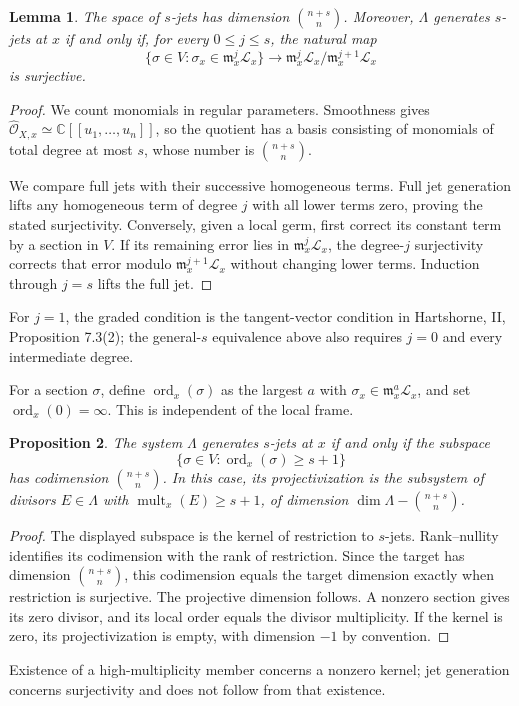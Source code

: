 \documentclass[12pt,a4paper,psamsfonts]{amsart}
\newtheorem{lemma}{Lemma}[section]
\newtheorem{proposition}[lemma]{Proposition}
\theoremstyle{definition}
\newcommand{\OO}{\mathcal O}
\newcommand{\C}{\mathbb C}
\begin{document}
\begin{lemma}
The space of $s$-jets has dimension $\binom{n+s}{n}$.
Moreover, $\Lambda$ generates $s$-jets at $x$ if and only if, for every
$0\le j\le s$, the natural map
\[
 \{\sigma\in V:\sigma_x\in\mathfrak m_x^j\mathcal L_x\}
 \longrightarrow
 \mathfrak m_x^j\mathcal L_x/\mathfrak m_x^{j+1}\mathcal L_x
\]
is surjective.
\end{lemma}
\begin{proof}
We count monomials in regular parameters. Smoothness gives
$\widehat{\OO}_{X,x}\simeq\C[[u_1,\ldots,u_n]]$, so the quotient has a
basis consisting of monomials of total degree at most $s$, whose number
is $\binom{n+s}{n}$.

We compare full jets with their successive homogeneous terms.
Full jet generation lifts any homogeneous term of degree $j$ with all
lower terms zero, proving the stated surjectivity. Conversely, given a
local germ, first correct its constant term by a section in $V$. If its
remaining error lies in $\mathfrak m_x^j\mathcal L_x$, the degree-$j$
surjectivity corrects that error modulo $\mathfrak m_x^{j+1}\mathcal L_x$
without changing lower terms. Induction through $j=s$ lifts the full jet.
\end{proof}
For $j=1$, the graded condition is the tangent-vector condition in
Hartshorne, II, Proposition 7.3(2); the general-$s$ equivalence above
also requires $j=0$ and every intermediate degree.

For a section $\sigma$, define $\operatorname{ord}_x(\sigma)$ as the
largest $a$ with $\sigma_x\in\mathfrak m_x^a\mathcal L_x$, and set
$\operatorname{ord}_x(0)=\infty$. This is independent of the local frame.

\begin{proposition}
The system $\Lambda$ generates $s$-jets at $x$ if and only if the subspace
\[
 \{\sigma\in V:\operatorname{ord}_x(\sigma)\ge s+1\}
\]
has codimension $\binom{n+s}{n}$. In this case, its projectivization is the subsystem
of divisors $E\in\Lambda$ with $\operatorname{mult}_x(E)\ge s+1$, of dimension
$\dim\Lambda-\binom{n+s}{n}$.
\end{proposition}
\begin{proof}
The displayed subspace is the kernel of restriction to $s$-jets.
Rank--nullity identifies its codimension with the rank of restriction.
Since the target has dimension $\binom{n+s}{n}$, this codimension
equals the target dimension exactly when restriction is surjective.
The projective dimension follows.
A nonzero section gives its zero divisor, and its local order equals
the divisor multiplicity. If the kernel is zero, its projectivization
is empty, with dimension $-1$ by convention.
\end{proof}
Existence of a high-multiplicity member concerns a nonzero kernel;
jet generation concerns surjectivity and does not follow from that existence.
\end{document}
